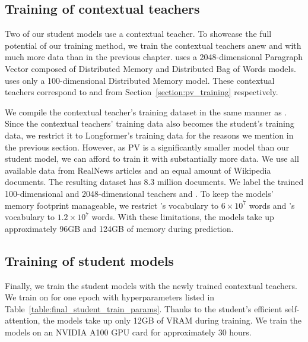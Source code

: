 \subsection{Training of contextual teachers}

Two of our student models use a contextual teacher. To showcase the full
potential of our training method, we train the contextual teachers anew and
with much more data than in the previous chapter. {\CosineStudent} uses a
2048-dimensional Paragraph Vector \citep{le2014distributed} composed of
Distributed Memory and Distributed Bag of Words models. {\MSEStudent} uses only
a 100-dimensional Distributed Memory model. These contextual teachers
correspond to  and  from
Section~\ref{section:pv_training} respectively.

We compile the contextual teacher's training dataset in the same manner as
. Since the contextual teachers' training data also becomes
the student's training data, we restrict it to Longformer's training data for
the reasons we mention in the previous section. However, as PV is a
significantly smaller model than our student model, we can afford to train it
with substantially more data. We use all available data from RealNews articles
and an equal amount of Wikipedia documents. The resulting dataset has 8.3
million documents. We label the trained 100-dimensional and 2048-dimensional
teachers  and . To keep the models' memory footprint
manageable, we restrict 's vocabulary to $6\times 10^7$ words and
's vocabulary to $1.2\times 10^7$ words. With these limitations, the
models take up approximately 96GB and 124GB of memory during prediction.

\subsection{Training of student models}

Finally, we train the student models with the newly trained contextual teachers.
We train on  for one epoch with hyperparameters listed in
Table~\ref{table:final_student_train_params}. Thanks to the student's efficient
self-attention, the models take up only 12GB of VRAM during training. We train
the models on an NVIDIA A100 GPU card for approximately 30 hours.

